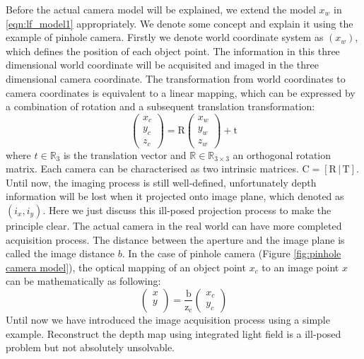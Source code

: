 Before the actual camera model will be explained, we extend the model $x_w$ in \ref{eqn:lf_model1} appropriately. We denote some concept and explain it using the example of pinhole camera. Firstly we denote world coordinate system as $(x_w)$, which defines the position of each object point. The information in this three dimensional world coordinate will be acquisited and imaged in the three dimensional camera coordinate. The transformation from world coordinates to camera coordinates is equivalent to a linear mapping, which can be expressed by a combination of rotation and a subsequent translation transformation:
\begin{equation}
\label{eqn:world-camera transformation}
\begin{pmatrix}
x_c \\
y_c\\
z_c
\end{pmatrix} = \mathrm{R}
\begin{pmatrix}
x_w \\
y_w\\
z_w
\end{pmatrix} + \mathrm{t}
\end{equation}
where $t \in \mathbb{R}_3$ is the translation vector and $\mathbb{R} ∈ \mathbb{R}_{3\times3}$ an orthogonal rotation matrix. Each camera can be characterised as two intrinsic matrices. $\mathrm{C} = [\mathrm{R}\,|\,\mathrm{T}]$.
Until now, the imaging process is still well-defined, unfortunately depth information will be lost when it projected onto image plane, which denoted as $(i_x, i_y)$. Here we just discuss this ill-posed projection process to make the principle clear. The actual camera in the real world can have more completed acquisition process. The distance between the aperture and the image plane is called the image distance $b$. In the case of pinhole camera (Figure \ref{fig:pinhole camera model}), the optical mapping of an object point $x_c$ to an image point $x$ can be mathematically as following:
\begin{equation}
\label{eqn:camera-image transformation}
\begin{pmatrix}
x\\
y\\
\end{pmatrix} = \mathrm{\frac{b}{z_c}}
\begin{pmatrix}
x_c \\
y_c
\end{pmatrix}
\end{equation}
Until now we have introduced the image acquisition process using a simple example. Reconstruct the depth map using integrated light field is a ill-posed problem but not absolutely unsolvable. 





